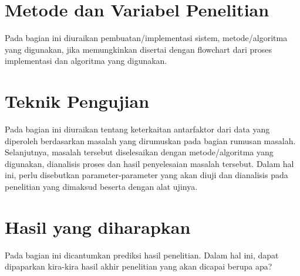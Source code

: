\section{Metode dan Variabel Penelitian}
Pada bagian ini diuraikan pembuatan/implementasi sistem,   metode/algoritma yang digunakan, jika memungkinkan disertai dengan flowchart dari proses implementasi dan algoritma yang digunakan.

\section{Teknik Pengujian}
Pada bagian ini diuraikan tentang keterkaitan antarfaktor dari data yang diperoleh  berdasarkan masalah yang dirumuskan pada bagian rumusan masalah. Selanjutnya,  masalah tersebut diselesaikan dengan metode/algoritma yang digunakan, dianalisis proses dan hasil penyelesaian masalah tersebut.  Dalam hal ini, perlu disebutkan parameter-parameter yang akan diuji dan dianalisis pada penelitian yang dimaksud beserta dengan alat ujinya.

\section{Hasil yang diharapkan}
Pada bagian ini dicantumkan prediksi hasil penelitian. Dalam hal ini, dapat dipaparkan kira-kira hasil akhir penelitian yang akan dicapai berupa apa?
